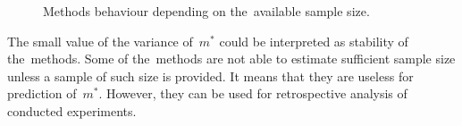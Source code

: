 \documentclass[
11pt,%
tightenlines,%
twoside,%
onecolumn,%
nofloats,%
nobibnotes,%
nofootinbib,%
superscriptaddress,%
noshowpacs,%
centertags]%
{revtex4}
\begin{document}
\begin{figure}[!hbp]
 \caption{Methods behaviour depending on the~available sample size.}
\label{fig2}
\end{figure}
 
The small value of the variance of~$m^*$ could be interpreted as stability of the~methods. 
Some of the~methods are not able to estimate sufficient sample size unless a sample of  such size is provided. It means that they are useless for prediction of~$m^*$. However, they can be used for retrospective analysis of conducted experiments.

%
%
\end{document}
